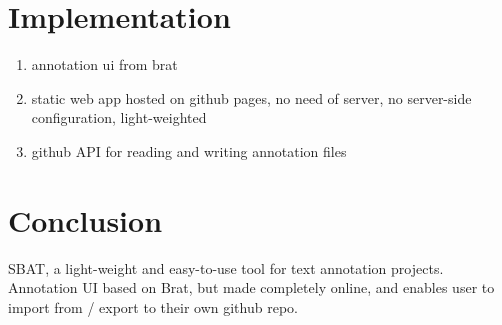 \documentclass[a4paper]{article}
\begin{document}
\section{Implementation}
\begin{enumerate}
\item annotation ui from brat
\item static web app hosted on github pages, no need of server, no server-side configuration, light-weighted
\item github API for reading and writing annotation files
\end{enumerate}

\section{Conclusion}
SBAT, a light-weight and easy-to-use tool for text annotation projects.\\ 
Annotation UI based on Brat, but made completely online, and enables user to import from / export to their own github repo.









%
%
\end{document}
